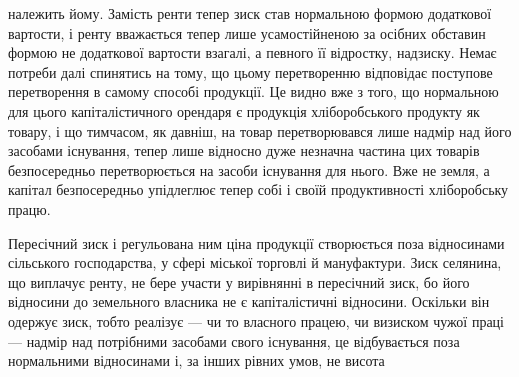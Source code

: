 належить йому. Замість ренти тепер зиск став нормальною формою додаткової
вартости, і ренту вважається тепер лише усамостійненою за осібних
обставин формою не додаткової вартости взагалі, а певного її відростку, надзиску.
Немає потреби далі спинятись на тому, що цьому перетворенню відповідає
поступове перетворення в самому способі продукції. Це видно вже з того,
що нормальною для цього капіталістичного орендаря є продукція хліборобського
продукту як товару, і що тимчасом, як давніш, на товар перетворювався лише
надмір над його засобами існування, тепер лише відносно дуже незначна частина
цих товарів безпосередньо перетворюється на засоби існування для нього.
Вже не земля, а капітал безпосередньо упідлеглює тепер собі і своїй продуктивності
хліборобську працю.

Пересічний зиск і регульована ним ціна продукції створюється поза відносинами
сільського господарства, у сфері міської торговлі й мануфактури. Зиск
селянина, що виплачує ренту, не бере участи у вирівнянні в пересічний зиск,
бо його відносини до земельного власника не є капіталістичні відносини.
Оскільки він одержує зиск, тобто реалізує — чи то власного працею, чи визиском
чужої праці — надмір над потрібними засобами свого існування, це відбувається
поза нормальними відносинами і, за інших рівних умов, не висота
